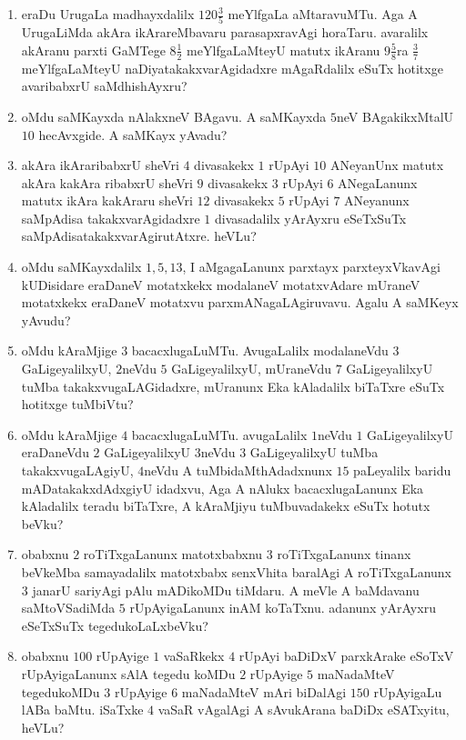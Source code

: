 \begin{enumerate}
\item eraDu UrugaLa madhayxdalilx $120 \frac{3}{5}$ meYlfgaLa
aMtaravuMTu. Aga A UrugaLiMda akAra ikArareMbavaru parasapxravAgi
horaTaru. avaralilx akAranu parxti GaMTege $8 \frac{1}{2}$
meYlfgaLaMteyU matutx ikAranu $9 \frac{5}{8}$ra $\frac{3}{7}$
meYlfgaLaMteyU naDiyatakakxvarAgidadxre mAgaRdalilx eSuTx hotitxge
avaribabxrU saMdhishAyxru?

\item oMdu saMKayxda nAlakxneV BAgavu. A saMKayxda $5$neV
BAgakikxMtalU $10$ hecAvxgide. A saMKayx yAvadu?

\item akAra ikAraribabxrU sheVri $4$ divasakekx $1$ rUpAyi $10$
ANeyanUnx matutx akAra kakAra ribabxrU sheVri $9$ divasakekx $3$
rUpAyi $6$ ANegaLanunx matutx ikAra kakAraru sheVri $12$ divasakekx
$5$ rUpAyi $7$ ANeyanunx saMpAdisa takakxvarAgidadxre $1$ divasadalilx
yArAyxru eSeTxSuTx saMpAdisatakakxvarAgirutAtxre. heVLu?

\item oMdu saMKayxdalilx $1, 5, 13$, I aMgagaLanunx
parxtayx parxteyxVkavAgi kUDisidare eraDaneV motatxkekx modalaneV
motatxvAdare mUraneV motatxkekx eraDaneV motatxvu
parxmANagaLAgiruvavu. Agalu A saMKeyx yAvudu?

\item oMdu kAraMjige $3$ bacacxlugaLuMTu. AvugaLalilx modalaneVdu $3$
GaLigeyalilxyU, $2$neVdu $5$ GaLigeyalilxyU, mUraneVdu $7$
GaLigeyalilxyU tuMba takakxvugaLAGidadxre, mUranunx Eka kAladalilx
biTaTxre eSuTx hotitxge tuMbiVtu?

\item oMdu kAraMjige $4$ bacacxlugaLuMTu. avugaLalilx $1$neVdu $1$
GaLigeyalilxyU eraDaneVdu $2$ GaLigeyalilxyU $3$neVdu $3$
GaLigeyalilxyU tuMba takakxvugaLAgiyU, $4$neVdu A tuMbidaMthAdadxnunx
$15$ paLeyalilx baridu mADatakakxdAdxgiyU idadxvu, Aga A nAlukx
bacacxlugaLanunx Eka kAladalilx teradu biTaTxre, A kAraMjiyu
tuMbuvadakekx eSuTx hotutx beVku?

\item obabxnu $2$ roTiTxgaLanunx matotxbabxnu $3$ roTiTxgaLanunx
tinanx beVkeMba samayadalilx matotxbabx senxVhita baralAgi A
roTiTxgaLanunx $3$ janarU sariyAgi pAlu mADikoMDu tiMdaru. A meVle A
baMdavanu saMtoVSadiMda $5$ rUpAyigaLanunx inAM koTaTxnu. adanunx
yArAyxru eSeTxSuTx tegedukoLaLxbeVku?

\item obabxnu $100$ rUpAyige $1$ vaSaRkekx $4$ rUpAyi baDiDxV
parxkArake eSoTxV rUpAyigaLanunx sAlA tegedu koMDu $2$ rUpAyige $5$
maNadaMteV tegedukoMDu $3$ rUpAyige $6$ maNadaMteV mAri biDalAgi $150$
rUpAyigaLu lABa baMtu. iSaTxke $4$ vaSaR vAgalAgi A sAvukArana baDiDx
eSATxyitu, heVLu?


\end{enumerate}

